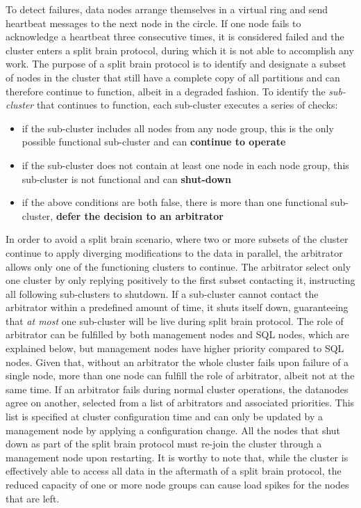 To detect failures, data nodes arrange themselves in a virtual ring and send heartbeat messages to the next node in the circle.
If one node fails to acknowledge a heartbeat three consecutive times, it is considered failed and the cluster enters a split brain protocol, during which it is not able to accomplish any work.
The purpose of a split brain protocol is to identify and designate a subset of nodes in the cluster that still have a complete copy of all partitions and can therefore continue to function, albeit in a degraded fashion.
To identify the \emph{sub-cluster} that continues to function, each sub-cluster executes a series of checks: \begin{itemize}
    \item if the sub-cluster includes all nodes from any node group, this is the only possible functional sub-cluster and can \textbf{continue to operate}
    \item if the sub-cluster does not contain at least one node in each node group, this sub-cluster is not functional and can \textbf{shut-down}
    \item if the above conditions are both false, there is more than one functional sub-cluster, \textbf{defer the decision to an arbitrator}
\end{itemize}
In order to avoid a split brain scenario, where two or more subsets of the cluster continue to apply diverging modifications to the data in parallel, the arbitrator allows only one of the functioning clusters to continue.
The arbitrator select only one cluster by only replying positively to the first subset contacting it, instructing all following sub-clusters to shutdown.
If a sub-cluster cannot contact the arbitrator within a predefined amount of time, it shuts itself down, guaranteeing that \emph{at most} one sub-cluster will be live during split brain protocol.
The role of arbitrator can be fulfilled by both management nodes and SQL nodes, which are explained below, but management nodes have higher priority compared to SQL nodes.
Given that, without an arbitrator the whole cluster fails upon failure of a single node, more than one node can fulfill the role of arbitrator, albeit not at the same time.
If an arbitrator fails during normal cluster operations, the datanodes agree on another, selected from a list of arbitrators and associated priorities.
This list is specified at cluster configuration time and can only be updated by a management node by applying a configuration change.
All the nodes that shut down as part of the split brain protocol must re-join the cluster through a management node upon restarting.
It is worthy to note that, while the cluster is effectively able to access all data in the aftermath of a split brain protocol, the reduced capacity of one or more node groups can cause load spikes for the nodes that are left.

